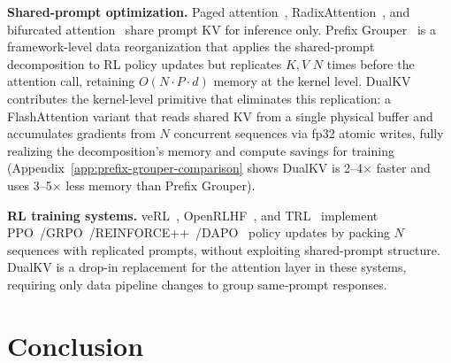 \documentclass{article}
\begin{document}
\textbf{Shared-prompt optimization.} Paged attention~\citep{kwon2023vllm}, RadixAttention~\citep{zheng2023sglang}, and bifurcated attention~\citep{athiwaratkun2024bifurcated} share prompt KV for inference only. Prefix Grouper~\citep{liu2025prefixgrouper} is a framework-level data reorganization that applies the shared-prompt decomposition to RL policy updates but replicates $K, V$ $N$ times before the attention call, retaining $O(N \cdot P \cdot d)$ memory at the kernel level. DualKV contributes the kernel-level primitive that eliminates this replication: a FlashAttention variant that reads shared KV from a single physical buffer and accumulates gradients from $N$ concurrent sequences via fp32 atomic writes, fully realizing the decomposition's memory and compute savings for training (Appendix~\ref{app:prefix-grouper-comparison} shows DualKV is 2--4$\times$ faster and uses 3--5$\times$ less memory than Prefix Grouper).

\textbf{RL training systems.} veRL~\citep{sheng2024verl}, OpenRLHF~\citep{hu2024openrlhf}, and TRL~\citep{vonwerra2020trl} implement PPO~\citep{schulman2017ppo}/GRPO~\citep{shao2024deepseekmath}/REINFORCE++~\citep{hu2025reinforceplusplus}/DAPO~\citep{yu2025dapo} policy updates by packing $N$ sequences with replicated prompts, without exploiting shared-prompt structure. DualKV is a drop-in replacement for the attention layer in these systems, requiring only data pipeline changes to group same-prompt responses.



\section{Conclusion}
\end{document}
